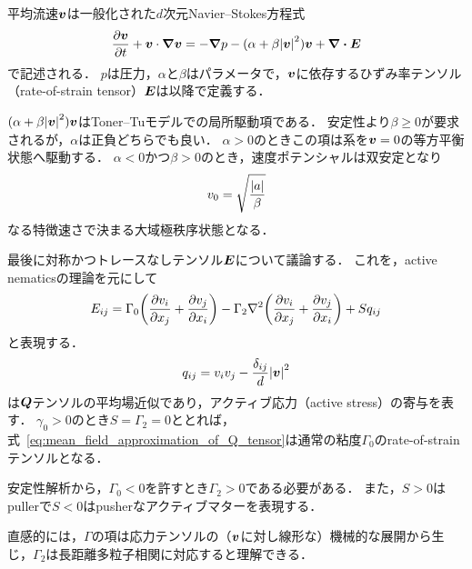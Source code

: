 \documentclass[12pt,dvipdfmx,svgnames,a4paper,uplatex]{ujarticle}
\theoremstyle{plain}
\begin{document}
平均流速\(\vb*{v}\)は一般化された\(d\)次元Navier--Stokes方程式
\begin{equation}
  \pdv{\vb*{v}}{t} + \vb*{v} \cdot \grad{\vb*{v}} = -\grad{p} - (\alpha + \beta \abs{\vb*{v}}^2) \vb*{v} + \div{\vb*{E}}
  \label{eq:generalized_NS}
\end{equation}
で記述される．
\(p\)は圧力，\(\alpha\)と\(\beta\)はパラメータで，\(\vb*{v}\)に依存するひずみ率テンソル（rate-of-strain tensor）\(\vb*{E}\)は以降で定義する．

\((\alpha + \beta \abs{\vb*{v}}^2) \vb*{v}\)はToner--Tuモデルでの局所駆動項である．
安定性より\(\beta \ge 0\)が要求されるが，\(\alpha\)は正負どちらでも良い．
\(\alpha > 0\)のときこの項は系を\(\vb*{v}=0\)の等方平衡状態へ駆動する．
\(\alpha < 0\)かつ\(\beta > 0\)のとき，速度ポテンシャルは双安定となり
\begin{equation}
  v_0 = \sqrt{\frac{\abs{a}}{\beta}}
  \label{eq:bistable_velocity_potential}
\end{equation}
なる特徴速さで決まる大域極秩序状態となる．

最後に対称かつトレースなしテンソル\(\vb*{E}\)について議論する．
これを，active nematicsの理論を元にして
\begin{equation}
  E_{ij} = \Gamma_0 \qty(\pdv{v_i}{x_j} + \pdv{v_j}{x_i}) - \Gamma_2 \laplacian \qty(\pdv{v_i}{x_j} + \pdv{v_j}{x_i}) + S q_{ij}
  \label{eq:rate-of-strain_tensor}
\end{equation}
と表現する．
\begin{equation}
  q_{ij} = v_i v_j - \frac{\delta_{ij}}{d} \abs{\vb*{v}}^2
  \label{eq:mean_field_approximation_of_Q_tensor}
\end{equation}
は\(\vb*{Q}\)テンソルの平均場近似であり，アクティブ応力（active stress）の寄与を表す．
\(\gamma_0 > 0\)のとき\(S=\Gamma_2=0\)ととれば，式~\ref{eq:mean_field_approximation_of_Q_tensor}は通常の粘度\(\Gamma_0\)のrate-of-strainテンソルとなる．

安定性解析から，\(\Gamma_0 < 0\)を許すとき\(\Gamma_2 > 0\)である必要がある．
また，\(S>0\)はpullerで\(S<0\)はpusherなアクティブマターを表現する．

直感的には，\(\Gamma\)の項は応力テンソルの（\(\vb*{v}\)に対し線形な）機械的な展開から生じ，\(\Gamma_2\)は長距離多粒子相関に対応すると理解できる．
\end{document}
